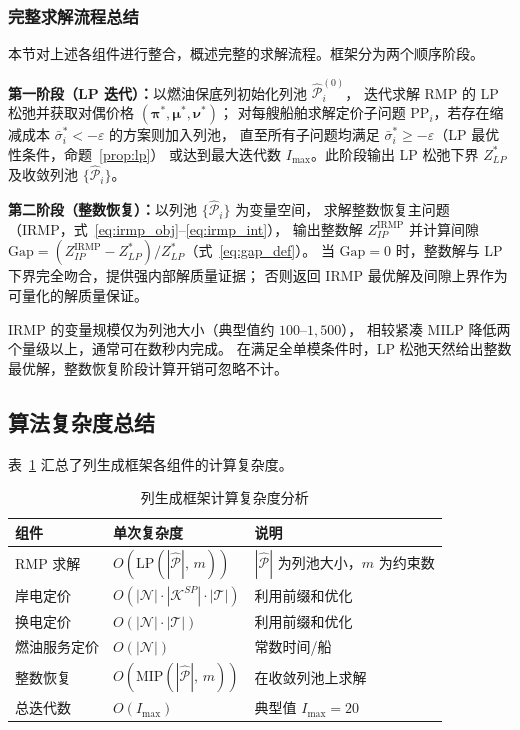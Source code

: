 \documentclass[UTF8, a4paper, 12pt]{ctexart}
\theoremstyle{plain}
\theoremstyle{definition}
\theoremstyle{remark}
\begin{document}
\subsubsection{完整求解流程总结}
\label{sec:cg_algorithm_full}
 
本节对上述各组件进行整合，概述完整的求解流程。框架分为两个顺序阶段。
 
\textbf{第一阶段（LP 迭代）：}以燃油保底列初始化列池 $\hat{\mathcal{P}}_i^{(0)}$，
迭代求解 RMP 的 LP 松弛并获取对偶价格 $(\boldsymbol{\pi}^*, \boldsymbol{\mu}^*, \boldsymbol{\nu}^*)$；
对每艘船舶求解定价子问题 $\text{PP}_i$，若存在缩减成本 $\bar{\sigma}_i^* < -\varepsilon$ 的方案则加入列池，
直至所有子问题均满足 $\bar{\sigma}_i^* \ge -\varepsilon$（LP 最优性条件，命题~\ref{prop:lp}）
或达到最大迭代数 $I_{\max}$。此阶段输出 LP 松弛下界 $Z_{LP}^*$ 及收敛列池 $\{\hat{\mathcal{P}}_i\}$。
 
\textbf{第二阶段（整数恢复）：}以列池 $\{\hat{\mathcal{P}}_i\}$ 为变量空间，
求解整数恢复主问题（IRMP，式~\eqref{eq:irmp_obj}--\eqref{eq:irmp_int}），
输出整数解 $Z_{IP}^{\text{IRMP}}$ 并计算间隙
$\text{Gap} = (Z_{IP}^{\text{IRMP}} - Z_{LP}^*)/Z_{LP}^*$（式~\eqref{eq:gap_def}）。
当 $\text{Gap}=0$ 时，整数解与 LP 下界完全吻合，提供强内部解质量证据；
否则返回 IRMP 最优解及间隙上界作为可量化的解质量保证。
 
IRMP 的变量规模仅为列池大小（典型值约 $100$--$1{,}500$），
相较紧凑 MILP 降低两个量级以上，通常可在数秒内完成。
在满足全单模条件时，LP 松弛天然给出整数最优解，整数恢复阶段计算开销可忽略不计。

\subsection{算法复杂度总结}
\label{sec:cg_complexity}

表~\ref{tab:complexity} 汇总了列生成框架各组件的计算复杂度。

\begin{table}[htbp]
\centering
\caption{列生成框架计算复杂度分析}
\label{tab:complexity}
\begin{tabular}{lll}
\toprule
组件 & 单次复杂度 & 说明 \\
\midrule
RMP 求解 & $O(\text{LP}(|\hat{\mathcal{P}}|,\, m))$
  & $|\hat{\mathcal{P}}|$ 为列池大小，$m$ 为约束数 \\
岸电定价 & $O(|\mathcal{N}| \cdot |\mathcal{K}^{SP}| \cdot |\mathcal{T}|)$
  & 利用前缀和优化 \\
换电定价 & $O(|\mathcal{N}| \cdot |\mathcal{T}|)$
  & 利用前缀和优化 \\
燃油服务定价 & $O(|\mathcal{N}|)$
  & 常数时间/船 \\
整数恢复 & $O(\text{MIP}(|\hat{\mathcal{P}}|,\, m))$
  & 在收敛列池上求解 \\
\midrule
总迭代数 & $O(I_{\max})$
  & 典型值 $I_{\max} = 20$ \\
\bottomrule
\end{tabular}
\end{table}
\end{document}
